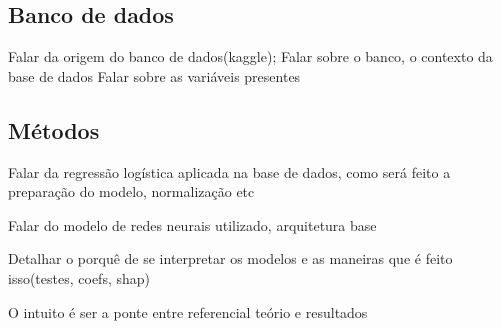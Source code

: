 \subsection*{Banco de dados}

Falar da origem do banco de dados(kaggle);
Falar sobre o banco, o contexto da base de dados
Falar sobre as variáveis presentes

\subsection*{Métodos}

Falar da regressão logística aplicada na base de dados,
como será feito a preparação do modelo, normalização etc

Falar do modelo de redes neurais utilizado, arquitetura base

Detalhar o porquê de se interpretar os modelos e as maneiras
que é feito isso(testes, coefs, shap)

O intuito é ser a ponte entre referencial teório e resultados
